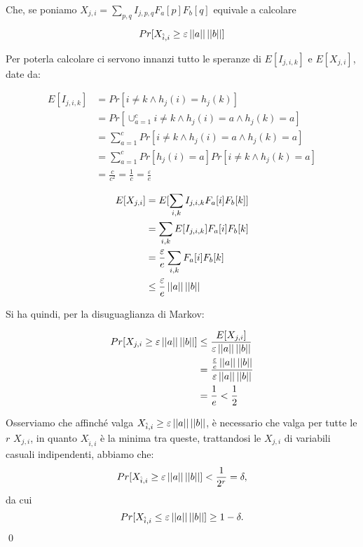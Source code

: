 \begin{itemize}
\begin{proof*}
    Che, se poniamo $X_{j, i} = \sum_{p, q} I_{j, p, q} F_a[p] F_b[q]$ equivale a calcolare

    \[ Pr[X_{\hat{i}, i} \ge \varepsilon \left|\left|a\right|\right|\left|\left|b\right|\right|] \]

    Per poterla calcolare ci servono innanzi tutto le speranze di $E[I_{j, i, k}]$
    e $E[X_{j,i}]$, date da:

    \begin{align}
        E[I_{j, i, k}] &= Pr\left[i \neq k \land h_j(i) = h_j(k)\right] \nonumber \\
        &= Pr\left[\cup_{a=1}^c i \neq k \land h_j(i) = a \land h_j(k) = a \right] \nonumber \\
        &= \sum_{a=1}^c Pr\left[i \neq k \land h_j(i) = a \land h_j(k) = a \right] \nonumber \\
        &= \sum_{a=1}^c Pr\left[h_j(i) = a\right]Pr\left[i \neq k \land h_j(k) = a \right] \nonumber \\
        &= \frac{c}{c^2} = \frac{1}{c} = \frac{\varepsilon}{e} \nonumber
    \end{align}

    \begin{align}
        E[X_{j, i}] &= E[\sum_{i, k} I_{j, i, k} F_a[i] F_b[k]] \nonumber \\
        &= \sum_{i, k} E[I_{j, i, k}] F_a[i] F_b[k] \nonumber \\
        &= \frac{\varepsilon}{e} \sum_{i, k} F_a[i]F_b[k] \nonumber \\
        &\le \frac{\varepsilon}{e} \left|\left|a\right|\right|\left|\left|b\right|\right| \nonumber
    \end{align}

    Si ha quindi, per la disuguaglianza di Markov:

    \begin{align}
        Pr[X_{j, i} \ge \varepsilon \left|\left|a\right|\right|\left|\left|b\right|\right|] &\le
            \frac{E[X_{j, i}]}{\varepsilon \left|\left|a\right|\right|\left|\left|b\right|\right|} \nonumber \\
            &= \frac{\frac{\varepsilon}{e} \left|\left|a\right|\right|\left|\left|b\right|\right|}
                {\varepsilon \left|\left|a\right|\right|\left|\left|b\right|\right|} \nonumber \\
            &= \frac{1}{e} < \frac{1}{2} \nonumber
    \end{align}

    Osserviamo che affinché valga $X_{\hat{i}, i} \ge \varepsilon \left|\left|a\right|\right|\left|\left|b\right|\right|$,
    è necessario che valga per tutte le $r$ $X_{j, i}$, in quanto $X_{\hat{i}, i}$
    è la minima tra queste, trattandosi le $X_{j, i}$ di variabili casuali
    indipendenti, abbiamo che:
    \[ Pr[X_{\hat{i}, i} \ge \varepsilon \left|\left|a\right|\right|\left|\left|b\right|\right|] < \frac{1}{2^r} = \delta, \]
    da cui
    \[ Pr[X_{\hat{i}, i} \le \varepsilon \left|\left|a\right|\right|\left|\left|b\right|\right|] \ge 1 - \delta. \]
    \qed
    \end{proof*}
\end{itemize}